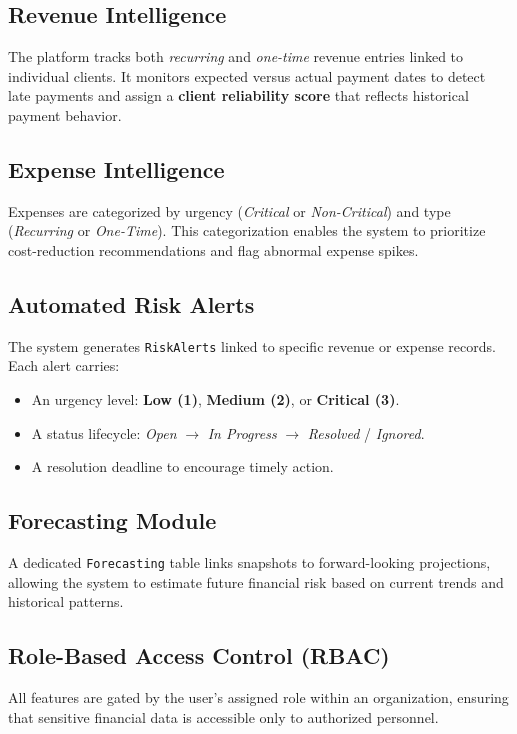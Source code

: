 \documentclass[12pt,a4paper]{article}
\begin{document}
\subsection{Revenue Intelligence}
The platform tracks both \emph{recurring} and \emph{one-time} revenue entries
linked to individual clients. It monitors expected versus actual payment dates
to detect late payments and assign a \textbf{client reliability score} that
reflects historical payment behavior.

\subsection{Expense Intelligence}
Expenses are categorized by urgency (\emph{Critical} or \emph{Non-Critical})
and type (\emph{Recurring} or \emph{One-Time}). This categorization enables
the system to prioritize cost-reduction recommendations and flag abnormal
expense spikes.

\subsection{Automated Risk Alerts}
The system generates \texttt{RiskAlerts} linked to specific revenue or expense
records. Each alert carries:
\begin{itemize}[leftmargin=1.5cm]
    \item An urgency level: \textbf{Low (1)}, \textbf{Medium (2)}, or
          \textbf{Critical (3)}.
    \item A status lifecycle: \emph{Open} $\to$ \emph{In Progress} $\to$
          \emph{Resolved} / \emph{Ignored}.
    \item A resolution deadline to encourage timely action.
\end{itemize}

\subsection{Forecasting Module}
A dedicated \texttt{Forecasting} table links snapshots to forward-looking
projections, allowing the system to estimate future financial risk based on
current trends and historical patterns.

\subsection{Role-Based Access Control (RBAC)}
All features are gated by the user's assigned role within an organization,
ensuring that sensitive financial data is accessible only to authorized
personnel.
\end{document}
